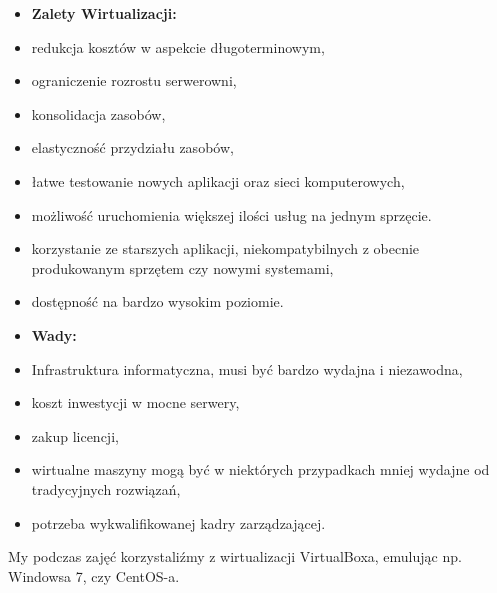 \begin{itemize}
	\setlength\itemsep{1pt}
	\item[] \textbf{Zalety Wirtualizacji: }
	\item redukcja kosztów w aspekcie długoterminowym,
	\item ograniczenie rozrostu serwerowni,
	\item konsolidacja zasobów,
	\item elastyczność przydziału zasobów,
	\item łatwe testowanie nowych aplikacji oraz sieci komputerowych,
	\item możliwość uruchomienia większej ilości usług na jednym sprzęcie.
	\item korzystanie ze starszych aplikacji, niekompatybilnych z obecnie produkowanym sprzętem czy nowymi systemami,
	\item dostępność na bardzo wysokim poziomie.
\end{itemize}
	
\begin{itemize}
	\setlength\itemsep{1pt}
	\item[] \textbf{Wady: }
	\item Infrastruktura informatyczna, musi być bardzo wydajna i niezawodna,
	\item koszt inwestycji w mocne serwery,
	\item zakup licencji,
	\item wirtualne maszyny mogą być w niektórych przypadkach mniej wydajne od tradycyjnych rozwiązań,
	\item potrzeba wykwalifikowanej kadry zarządzającej.
\end{itemize}
	
My podczas zajęć korzystaliźmy z wirtualizacji VirtualBoxa, emulując np. Windowsa 7, czy CentOS-a.
		
		
		
		
		
		
		
